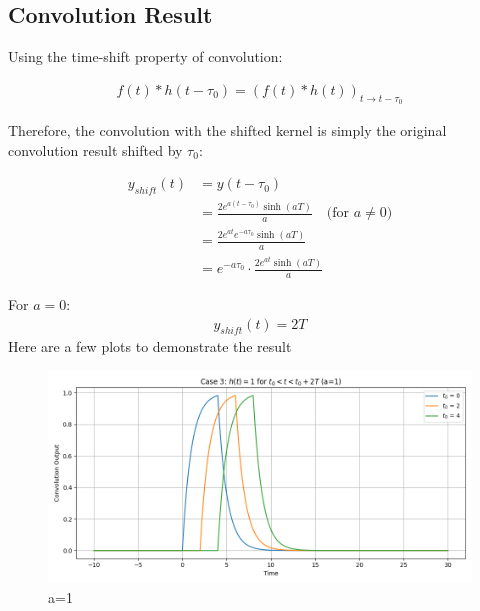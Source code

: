 \documentclass[12pt,a4paper,titlepage]{article}
\begin{document}
\subsection{Convolution Result}
Using the time-shift property of convolution:

\begin{align}
f(t) * h(t-\tau_0) = (f(t) * h(t))_{t \rightarrow t-\tau_0}
\end{align}

Therefore, the convolution with the shifted kernel is simply the original convolution result shifted by $\tau_0$:

\begin{align}
y_{shift}(t) &= y(t-\tau_0) \\
&= \frac{2e^{a(t-\tau_0)}\sinh(aT)}{a} \quad \text{(for $a \neq 0$)} \\
&= \frac{2e^{at}e^{-a\tau_0}\sinh(aT)}{a} \\
&= e^{-a\tau_0} \cdot \frac{2e^{at}\sinh(aT)}{a}
\end{align}

For $a = 0$:
\begin{align}
y_{shift}(t) = 2T
\end{align}
Here are a few plots to demonstrate the result
\begin{figure}[H]
    \centering
    { 
    }
\end{figure}
\begin{figure}[H]
    \centering
    \includegraphics[width=0.7\linewidth]{plotseax/case3a=1.png}
    \caption{a=1}
    \label{fig:enter-label}
\end{figure}
\end{document}

